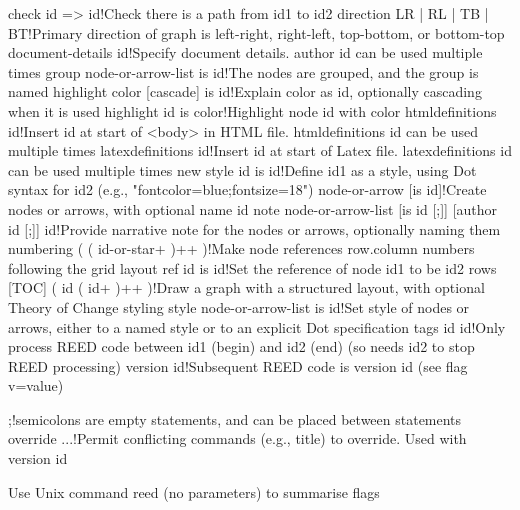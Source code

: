 check id => id!Check there is a path from id1 to id2
direction {LR | RL | TB | BT}!Primary direction of graph is left-right, right-left, top-bottom, or bottom-top
document-details id!Specify document details. author id can be used multiple times
group node-or-arrow-list is id!The nodes are grouped, and the group is named
highlight color [cascade] is id!Explain color as id, optionally cascading when it is used
highlight id is color!Highlight node id with color
htmldefinitions id!Insert id at start of <body> in HTML file. htmldefinitions id can be used multiple times
latexdefinitions id!Insert id at start of Latex file. latexdefinitions id can be used multiple times
new style id is id!Define id1 as a style, using Dot syntax for id2 (e.g., "fontcolor=blue;fontsize=18")
node-or-arrow [is id]!Create nodes or arrows, with optional name id
note node-or-arrow-list [is id [;]] [author id [;]] id!Provide narrative note for the nodes or arrows, optionally naming them
numbering ( {( id-or-star+ )}++ )!Make node references row.column numbers following the grid layout
ref id is id!Set the reference of node id1 to be id2
rows [TOC] ( {id ( id+ )}++ )!Draw a graph with a structured layout, with optional Theory of Change styling
style node-or-arrow-list is id!Set style of nodes or arrows, either to a named style or to an explicit Dot specification
tags id id!Only process REED code between id1 (begin) and id2 (end) (so needs id2 to stop REED processing)
version id!Subsequent REED code is version id (see flag v=value)

;!semicolons are empty statements, and can be placed between statements
override ...!Permit conflicting commands (e.g., title) to override. Used with version id

Use Unix command reed (no parameters) to summarise flags











